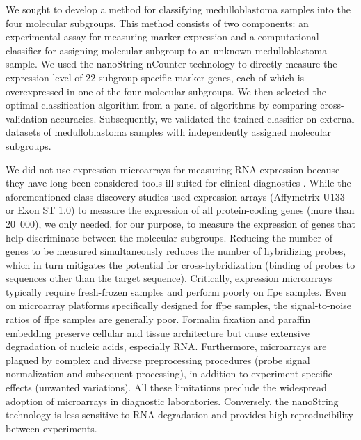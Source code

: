 We sought to develop a method for classifying medulloblastoma samples into the four molecular subgroups. This method consists of two components: an experimental assay for measuring marker expression and a computational classifier for assigning molecular subgroup to an unknown medulloblastoma sample. We used the nanoString nCounter technology  to directly measure the expression level of 22 subgroup-specific marker genes, each of which is overexpressed in one of the four molecular subgroups. We then selected the optimal classification algorithm from a panel of algorithms by comparing cross-validation accuracies. Subsequently, we validated the trained classifier on external datasets of medulloblastoma samples with independently assigned molecular subgroups.

We did not use expression microarrays for measuring RNA expression because they have long been considered tools ill-suited for clinical diagnostics . While the aforementioned class-discovery studies used expression arrays (Affymetrix U133 or Exon ST 1.0) to measure the expression of all protein-coding genes (more than 20~000), we only needed, for our purpose, to measure the expression of genes that help discriminate between the molecular subgroups.  Reducing the number of genes to be measured simultaneously reduces the number of hybridizing probes, which in turn mitigates the potential for cross-hybridization (binding of probes to sequences other than the target sequence). Critically, expression microarrays typically require fresh-frozen samples and perform poorly on \gls{ffpe} samples. Even on microarray platforms specifically designed for \gls{ffpe} samples, the signal-to-noise ratios of \gls{ffpe} samples are generally poor. Formalin fixation and paraffin embedding preserve cellular and tissue architecture but cause extensive degradation of nucleic acids, especially RNA. Furthermore, microarrays are plagued by complex and diverse preprocessing procedures (probe signal normalization and subsequent processing), in addition to experiment-specific effects (unwanted variations). All these limitations preclude the widespread adoption of microarrays in diagnostic laboratories. Conversely, the nanoString technology is less sensitive to RNA degradation and provides high reproducibility between experiments.

